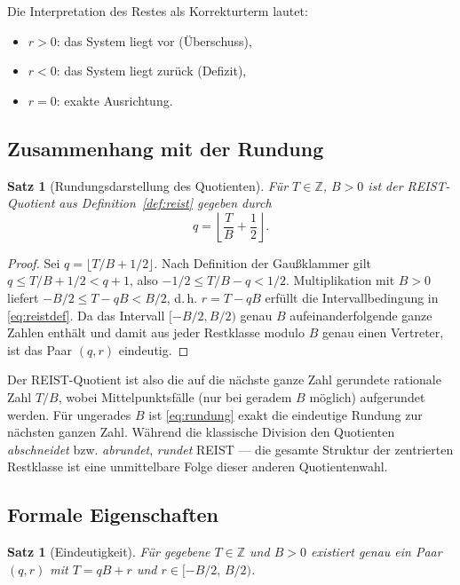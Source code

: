 \documentclass[11pt,a4paper]{scrartcl}
\theoremstyle{definition}
\theoremstyle{plain}
\newtheorem{satz}[definition]{Satz}
\theoremstyle{remark}
\newcommand{\Z}{\mathbb{Z}}
\begin{document}
Die Interpretation des Restes als Korrekturterm lautet:
\begin{itemize}
\item $r > 0$: das System liegt vor (Überschuss),
\item $r < 0$: das System liegt zurück (Defizit),
\item $r = 0$: exakte Ausrichtung.
\end{itemize}

\subsection{Zusammenhang mit der Rundung}

\begin{satz}[Rundungsdarstellung des Quotienten]
\label{satz:rundung}
Für $T \in \Z$, $B > 0$ ist der REIST-Quotient aus Definition~\ref{def:reist} gegeben durch
\begin{equation}
q = \left\lfloor \frac{T}{B} + \frac{1}{2} \right\rfloor.
\label{eq:rundung}
\end{equation}
\end{satz}

\begin{proof}
Sei $q = \lfloor T/B + 1/2 \rfloor$. Nach Definition der Gaußklammer gilt
$q \le T/B + 1/2 < q + 1$, also $-1/2 \le T/B - q < 1/2$. Multiplikation mit $B > 0$ liefert $-B/2 \le T - qB < B/2$, d.\,h. $r = T - qB$ erfüllt die Intervallbedingung in \eqref{eq:reistdef}. Da das Intervall $[-B/2, B/2)$ genau $B$ aufeinanderfolgende ganze Zahlen enthält und damit aus jeder Restklasse modulo $B$ genau einen Vertreter, ist das Paar $(q,r)$ eindeutig.
\end{proof}

Der REIST-Quotient ist also die auf die nächste ganze Zahl gerundete rationale Zahl $T/B$, wobei Mittelpunktsfälle (nur bei geradem $B$ möglich) aufgerundet werden. Für ungerades $B$ ist \eqref{eq:rundung} exakt die eindeutige Rundung zur nächsten ganzen Zahl. Während die klassische Division den Quotienten \emph{abschneidet} bzw. \emph{abrundet}, \emph{rundet} REIST --- die gesamte Struktur der zentrierten Restklasse ist eine unmittelbare Folge dieser anderen Quotientenwahl.

\subsection{Formale Eigenschaften}
\label{sec:eigenschaften}

\begin{satz}[Eindeutigkeit]
\label{satz:eindeutigkeit}
Für gegebene $T \in \Z$ und $B > 0$ existiert genau ein Paar $(q, r)$ mit $T = qB + r$ und $r \in [-B/2,\, B/2)$.
\end{satz}
\end{document}
